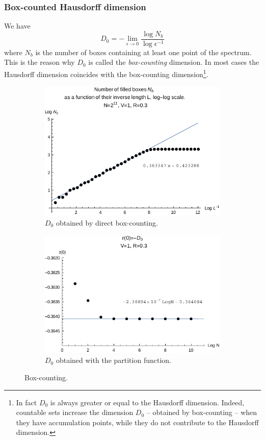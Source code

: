 \documentclass[11pt]{article}
\begin{document}
\subsubsection{Box-counted Hausdorff dimension}

We have
\begin{equation}
	D_0 = - \lim_{\epsilon \rightarrow 0} \frac{\log N_b}{\log \epsilon^{-1}}
\end{equation}
where $N_b$ is the number of boxes containing at least one point of the spectrum.
This is the reason why $D_0$ is called the \emph{box-counting} dimension.
In most cases the Hausdorff dimension coincides with the box-counting dimension\footnote{In fact $D_0$ is always greater or equal to the Hausdorff dimension. Indeed, countable sets increase the dimension $D_0$ -- obtained by box-counting -- when they have accumulation points, while they do not contribute to the Hausdorff dimension.}. 

\begin{figure}[htp]
\centering
\begin{subfigure}{.5\textwidth}
  \centering
  \includegraphics[width=.9\linewidth]{data/box_counting.pdf}
  \caption{$D_0$ obtained by direct box-counting.}
  \label{fig:direct_bc}
\end{subfigure}%
\begin{subfigure}{.5\textwidth}
  \centering
  \includegraphics[width=.9\linewidth]{data/hausdorff.pdf}
  \caption{$D_0$ obtained with the partition function.}
  \label{fig:partition_bc}
\end{subfigure}
\caption{Box-counting.}
\label{fig:bc}
\end{figure}
\end{document}
